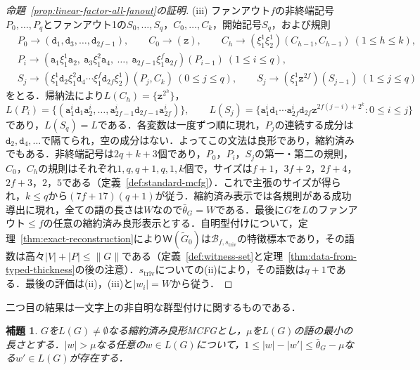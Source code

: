 \documentclass[11pt,a4paper]{ltjsarticle}
\numberwithin{equation}{section}
\theoremstyle{plain}
\newtheorem{lemma}[theorem]{補題}
\theoremstyle{definition}
\theoremstyle{remark}
\newcommand{\Wit}{\mathsf{W}}
\begin{document}
\begin{proof}[命題~\ref{prop:linear-factor-all-fanout}の証明]
(iii) ファンアウト$f$の非終端記号$P_0,\ldots,P_q$とファンアウト1の$S_0,\ldots,S_q$，$C_0,\ldots,C_k$，開始記号$S_q$，および規則
\[
\begin{aligned}
 &P_0\to(\mathtt d_1,\mathtt d_3,\ldots,\mathtt d_{2f-1}),\qquad
 C_0\to(\mathtt z),\qquad
 C_h\to(\xi_1^1\xi_2^1)(C_{h-1},C_{h-1})\ (1\le h\le k),\\
 &P_i\to(\mathtt a_1\xi_1^1\mathtt a_2,\ \mathtt a_3\xi_1^2\mathtt a_4,\ \ldots,\
 \mathtt a_{2f-1}\xi_1^f\mathtt a_{2f})(P_{i-1})\ (1\le i\le q),\\
 &S_j\to(\xi_1^1\mathtt d_2\xi_1^2\mathtt d_4\cdots\xi_1^f\mathtt d_{2f}\xi_2^1)(P_j,C_k)
 \ (0\le j\le q),\qquad
 S_j\to(\xi_1^1\mathtt z^{2f})(S_{j-1})\ (1\le j\le q)
\end{aligned}
\]
をとる．帰納法により$L(C_h)=\{\mathtt z^{2^h}\}$，
\[
 L(P_i)=\{(\mathtt a_1^i\mathtt d_1\mathtt a_2^i,\ldots,
 \mathtt a_{2f-1}^i\mathtt d_{2f-1}\mathtt a_{2f}^i)\},\qquad
 L(S_j)=\{\mathtt a_1^i\mathtt d_1\cdots\mathtt a_{2f}^i\mathtt d_{2f}
 \mathtt z^{2f(j-i)+2^k}:0\le i\le j\}
\]
であり，$L(S_q)=L$である．各変数は一度ずつ順に現れ，$P_j$の連続する成分は$\mathtt d_2,\mathtt d_4,\ldots$で隔てられ，空の成分はない．よってこの文法は良形であり，縮約済みでもある．非終端記号は$2q+k+3$個であり，$P_0$，$P_i$，$S_j$の第一・第二の規則，$C_0$，$C_h$の規則はそれぞれ$1,q,q+1,q,1,k$個で，サイズは$f+1$，$3f+2$，$2f+4$，$2f+3$，$2$，$5$である（定義~\ref{def:standard-mcfg}）．これで主張のサイズが得られ，$k\le q$から$(7f+17)(q+1)$が従う．縮約済み表示では各規則がある成功導出に現れ，全ての語の長さは$W$なので$\bar\theta_G=W$である．最後に$G$を$L$のファンアウト$\le f$の任意の縮約済み良形表示とする．自明型付けについて，定理~\ref{thm:exact-reconstruction}により$\Wit(\widetilde G_0)$は$\mathcal B_{f,s_{\mathrm{triv}}}$の特徴標本であり，その語数は高々$|V|+|P|\le\|G\|$である（定義~\ref{def:witness-set}と定理~\ref{thm:data-from-typed-thickness}の後の注意）．$s_{\mathrm{triv}}$についての(ii)により，その語数は$q+1$である．最後の評価は(ii)，(iii)と$|w_i|=W$から従う．
\end{proof}

二つ目の結果は一文字上の非自明な群型付けに関するものである．

\begin{lemma}\label{lem:app-lf-descent}
$G$を$L(G)\ne\emptyset$なる縮約済み良形MCFGとし，$\mu$を$L(G)$の語の最小の長さとする．$|w|>\mu$なる任意の$w\in L(G)$について，$1\le|w|-|w'|\le\bar\theta_G-\mu$なる$w'\in L(G)$が存在する．
\end{lemma}
\end{document}
